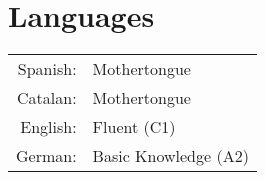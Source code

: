 \section{Languages}
\begin{tabular}{ >{\sc} r l}
	Spanish:	& Mothertongue		\\
	Catalan:	& Mothertongue		\\
	English:	& Fluent (C1)		\\
	German:		& Basic Knowledge (A2)	\\
\end{tabular}
